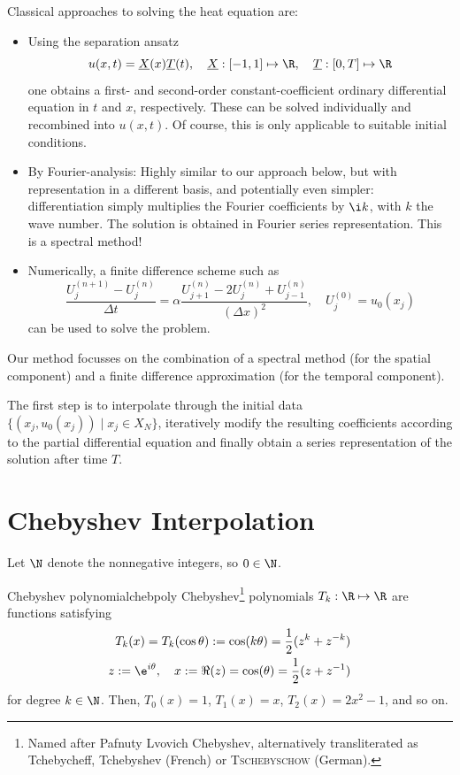 \documentclass[12pt, a4paper]{article}
\newcommand{\chebyshev}{Chebyshev\xspace}
\begin{document}
  Classical approaches to solving the heat equation are:
  \begin{itemize}
    \item Using the separation ansatz
          $$u(x, t) = \underline{X}(x) \underline{T}(t), \quad \underline{X}: [-1, 1] \mapsto \R, \quad \underline{T}: [0, T] \mapsto \R$$
          one obtains a first- and second-order constant-coefficient ordinary differential equation in $t$ and $x$, respectively. These can be solved individually and recombined into $u(x, t)$. Of course, this is only applicable to suitable initial conditions.

    \item By Fourier-analysis: Highly similar to our approach below, but with representation in a different basis, and potentially even simpler: differentiation simply multiplies the Fourier coefficients by $\i k$, with $k$ the wave number. The solution is obtained in Fourier series representation. This is a spectral method!

    \item Numerically, a finite difference scheme such as
          $$\frac{U_{j}^{(n+1)} - U_{j}^{(n)}}{\Delta t} = \alpha \frac{U_{j+1}^{(n)} - 2 U_{j}^{(n)} + U_{j-1}^{(n)}}{(\Delta x)^2}, \quad U_j^{(0)} = u_0(x_j)$$ can be used to solve the problem.
  \end{itemize}

  Our method focusses on the combination of a spectral method (for the spatial component) and a finite difference approximation (for the temporal component).

  The first step is to interpolate through the initial data $\{(x_j, u_0(x_j)) \;|\; x_j \in X_N\}$, iteratively modify the resulting coefficients according to the partial differential equation and finally obtain a series representation of the solution after time $T$.

  \pagebreak
  \section{Chebyshev Interpolation}
  Let $\N$ denote the nonnegative integers, so $0 \in \N$.

  \begin{definition}{Chebyshev polynomial}{chebpoly}
    \chebyshev\footnote{Named after Pafnuty Lvovich \chebyshev, alternatively transliterated as Tchebycheff, Tchebyshev (French) or \textsc{Tschebyschow} (German).} polynomials $T_k: \R \mapsto \R$ are functions satisfying
    \begin{align*}
      T_k(x) = T_k(\cos \theta) := \cos(k \theta) = \frac{1}{2} (z^k + z^{-k}) \\
      z := \e^{i \theta},\quad x := \Re(z) = \cos(\theta) = \frac{1}{2}(z + z^{-1})
    \end{align*}
    for degree $k \in \N$. Then, $T_0(x) = 1$, $T_1(x) = x$, $T_2(x) = 2x^2-1$, and so on.
  \end{definition}
\end{document}
